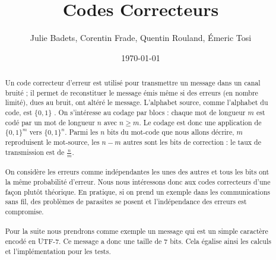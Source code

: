 \documentclass[a4paper,11pt]{report}
\title{Codes Correcteurs}
\author{Julie Badets, Corentin Frade, Quentin Rouland, Émeric Tosi}
\date{\today}
\begin{document}
    \maketitle{} %




    \begin{abstract} %
        \paragraph{}
Un code correcteur d'erreur est utilisé pour transmettre un message dans un canal bruité ;
il permet de reconstituer le message émis même si des erreurs (en nombre limité), dues au bruit, ont altéré le message.
L'alphabet source, comme l'alphabet du code, est $\{0,1\}$ .
On s'intéresse au codage par blocs : chaque mot de longueur $ m $ est codé par un mot de longueur $n$ avec $n \geq m$.
Le codage est donc une application de $\{0,1\}^{m}$  vers $\{0,1\}^{n}$.
Parmi les $n$ bits du mot-code que nous allons décrire, $m$ reproduisent le mot-source,
les $n-m$ autres sont les bits de correction : le taux de transmission est de $\frac{n}{m}$.
        \paragraph{}
On considère les erreurs comme indépendantes les unes des autres et tous les bits ont la même probabilité d'erreur.
Nous nous intéressons donc aux codes correcteurs d'une façon plutôt théorique.
En pratique, si on prend un exemple dans les communications sans fil,
des problèmes de parasites se posent et l'indépendance des erreurs est compromise.
        \paragraph{}
Pour la suite nous prendrons comme exemple un message qui est un simple caractère encodé en UTF-7.
Ce message a donc une taille de 7 bits.
Cela égalise ainsi les calculs et l'implémentation pour les tests.
    \end{abstract}
    \clearpage
\end{document}
